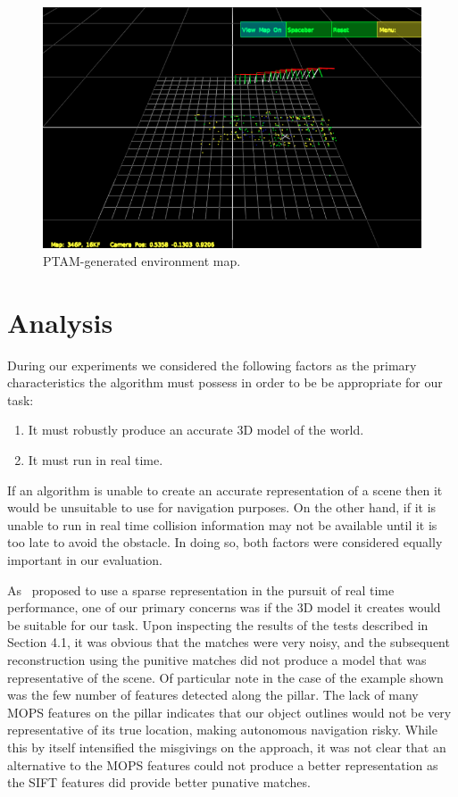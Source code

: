 \documentclass{acmsiggraph}
\begin{document}
\begin{figure}[h]
  \centering
  \includegraphics[resolution=150, scale=0.5]{images/ptam-map}
  \caption{PTAM-generated environment map.}
  \label{fig:ptam-ex}
\end{figure}

\section{Analysis}
During our experiments we considered the following factors as the primary characteristics the algorithm must possess in order
to be be appropriate for our task:

\begin{enumerate}
 \item It must robustly produce an accurate 3D model of the world.
 \item It must run in real time.
\end{enumerate}

If an algorithm is unable to create an accurate representation of a scene then it would be unsuitable to use for navigation
purposes.  On the other hand, if it is unable to run in real time collision information may not be available until it is too
late to avoid the obstacle.  In doing so, both factors were considered equally important in our evaluation.

As~\cite{lee2011} proposed to use a sparse representation in the pursuit of real time performance, one of our primary 
concerns was if the 3D model it creates would be suitable for our task.  Upon inspecting the results of the tests described
in Section 4.1, it was obvious that the matches were very noisy, and the subsequent reconstruction using the punitive matches
did not produce a model that was representative of the scene.  Of particular note in the case of the example shown was the 
few number of features detected along the pillar.  The lack of many MOPS features on the pillar indicates 
that our object outlines would not be very representative of its true location, making autonomous navigation risky.  While 
this by itself intensified the misgivings on the approach, it was not clear that an alternative to the MOPS features could 
not produce a better representation as the SIFT features did provide better punative matches.
\end{document}
